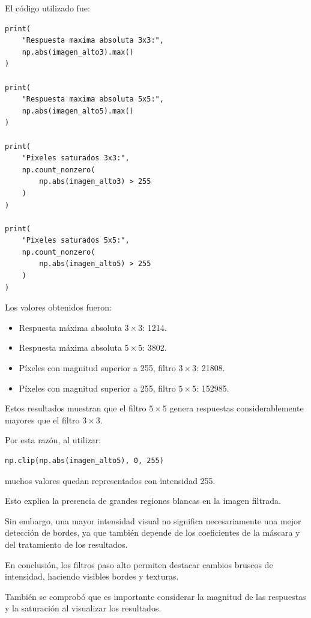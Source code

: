 \documentclass[11pt,letterpaper]{article}
\begin{document}
El código utilizado fue:

\begin{lstlisting}
print(
    "Respuesta maxima absoluta 3x3:",
    np.abs(imagen_alto3).max()
)

print(
    "Respuesta maxima absoluta 5x5:",
    np.abs(imagen_alto5).max()
)

print(
    "Pixeles saturados 3x3:",
    np.count_nonzero(
        np.abs(imagen_alto3) > 255
    )
)

print(
    "Pixeles saturados 5x5:",
    np.count_nonzero(
        np.abs(imagen_alto5) > 255
    )
)
\end{lstlisting}

Los valores obtenidos fueron:

\begin{itemize}

    \item Respuesta máxima absoluta $3\times3$: 1214.
    \item Respuesta máxima absoluta $5\times5$: 3802.
    \item Píxeles con magnitud superior a 255,
    filtro $3\times3$: 21808.
    \item Píxeles con magnitud superior a 255,
    filtro $5\times5$: 152985.

\end{itemize}

Estos resultados muestran que el filtro
$5\times5$ genera respuestas considerablemente
mayores que el filtro $3\times3$.

Por esta razón, al utilizar:

\begin{lstlisting}
np.clip(np.abs(imagen_alto5), 0, 255)
\end{lstlisting}

muchos valores quedan representados
con intensidad 255.

Esto explica la presencia de grandes
regiones blancas en la imagen filtrada.

Sin embargo, una mayor intensidad
visual no significa necesariamente
una mejor detección de bordes,
ya que también depende de los
coeficientes de la máscara
y del tratamiento de los resultados.

En conclusión, los filtros paso alto
permiten destacar cambios bruscos
de intensidad, haciendo visibles
bordes y texturas.

También se comprobó que es importante
considerar la magnitud de las respuestas
y la saturación al visualizar
los resultados.
\end{document}
